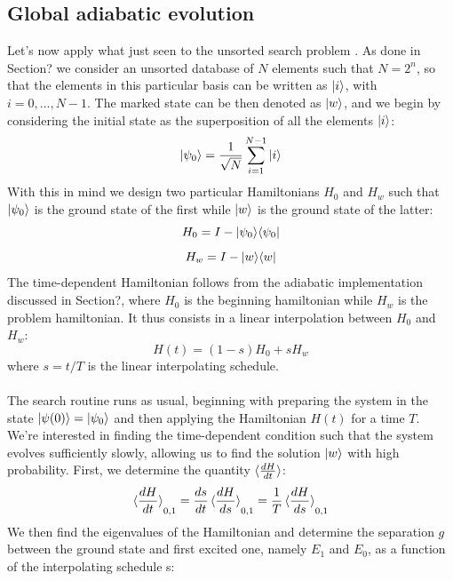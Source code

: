     \subsection{Global adiabatic evolution}
    Let's now apply what just seen to the unsorted search problem \cite{Roland2002}. As done in Section? we consider an unsorted database of $N$ elements such that $N=2^n$, so that the elements in this particular basis can be written as ${|{i}\rangle}$, with $i=0,...,N-1$. The marked state can be then denoted as ${|{w}\rangle}$, and we begin by considering the initial state as the superposition of all the elements ${|{i}\rangle}$:
    \begin{equation}
      {|{\psi_0}\rangle}=\frac{1}{\sqrt{N}}\sum_{i=1}^{N-1}{|{i}\rangle}
    \end{equation}
    With this in mind we design two particular Hamiltonians $H_0$ and $H_w$ such that ${|{\psi_0}\rangle}$ is the ground state of the first while ${|{w}\rangle}$ is the ground state of the latter:
    \begin{equation}
      H_0 = I- {|{\psi_0}\rangle}{\langle{\psi_0}|}
    \end{equation}
    \vspace{-1cm}
    \begin{equation}
      H_w = I- {|{w}\rangle}{\langle{w}|}
    \end{equation}
    The time-dependent Hamiltonian follows from the adiabatic implementation discussed in Section?, where $H_0$ is the beginning hamiltonian while $H_w$ is the problem hamiltonian. It thus consists in a linear interpolation between $H_0$ and $H_w$:
    \begin{equation}
      H(t) = (1-s)H_0 + sH_w
    \end{equation}
    where $s=t/T$ is the linear interpolating schedule.\\ \\
    The search routine runs as usual, beginning with preparing the system in the state ${|{\psi(0)}\rangle}={|{\psi_0}\rangle}$ and then applying the Hamiltonian $H(t)$ for a time $T$. We're interested in finding the time-dependent condition such that the system evolves sufficiently slowly, allowing us to find the solution ${|{w}\rangle}$ with high probability. First, we determine the quantity $\braket{\frac{dH}{dt}}$:
    \begin{equation}
      \braket{\frac{dH}{dt}}_{0,1} = \frac{ds}{dt}\braket{\frac{dH}{ds}}_{0,1} = \frac{1}{T}\braket{\frac{dH}{ds}}_{0,1}
    \end{equation}
    We then find the eigenvalues of the Hamiltonian and determine the separation $g$ between the ground state and first excited one, namely $E_1$ and $E_0$, as a function of the interpolating schedule s:
